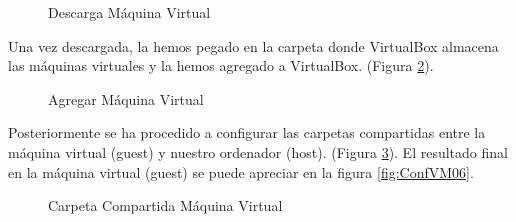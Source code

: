 \documentclass{scrartcl}
\begin{document}
\begin{figure}[H]
	
	\centering
	\caption{Descarga Máquina Virtual}
	\label{fig:ConfVM01}
	
\end{figure}

Una vez descargada, la hemos pegado en la carpeta donde VirtualBox almacena las máquinas virtuales y la hemos agregado a VirtualBox. (Figura \ref{fig:ConfVM02}).

\begin{figure}[H]
	
	\centering
	\caption{Agregar Máquina Virtual}
	\label{fig:ConfVM02}
	
\end{figure}

Posteriormente se ha procedido a configurar las carpetas compartidas entre la máquina virtual (guest) y nuestro ordenador (host). (Figura \ref{fig:ConfVM03}). El resultado final en la máquina virtual (guest) se puede apreciar en la figura \ref{fig:ConfVM06}.

\begin{figure}[H]
	
	\centering
	\caption{Carpeta Compartida Máquina Virtual}
	\label{fig:ConfVM03}
	
\end{figure}
\end{document}
